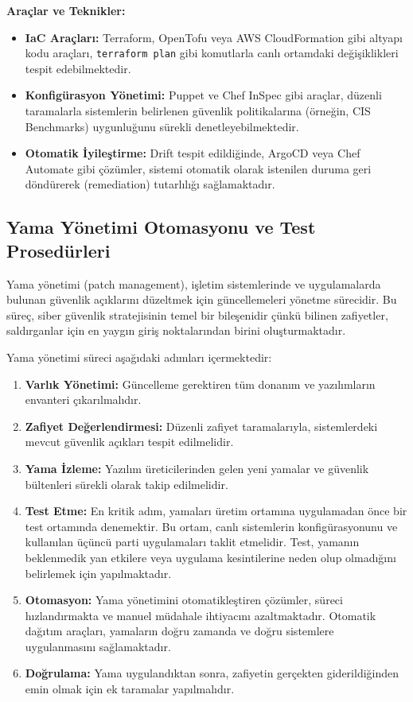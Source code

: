 \textbf{Araçlar ve Teknikler:}
\begin{itemize}
    \item \textbf{IaC Araçları:} Terraform, OpenTofu veya AWS CloudFormation gibi altyapı kodu araçları, \texttt{terraform plan} gibi komutlarla canlı ortamdaki değişiklikleri tespit edebilmektedir.
    \item \textbf{Konfigürasyon Yönetimi:} Puppet ve Chef InSpec gibi araçlar, düzenli taramalarla sistemlerin belirlenen güvenlik politikalarına (örneğin, CIS Benchmarks) uygunluğunu sürekli denetleyebilmektedir.
    \item \textbf{Otomatik İyileştirme:} Drift tespit edildiğinde, ArgoCD veya Chef Automate gibi çözümler, sistemi otomatik olarak istenilen duruma geri döndürerek (remediation) tutarlılığı sağlamaktadır.
\end{itemize}

\subsection{Yama Yönetimi Otomasyonu ve Test Prosedürleri}

Yama yönetimi (patch management), işletim sistemlerinde ve uygulamalarda bulunan güvenlik açıklarını düzeltmek için güncellemeleri yönetme sürecidir. Bu süreç, siber güvenlik stratejisinin temel bir bileşenidir çünkü bilinen zafiyetler, saldırganlar için en yaygın giriş noktalarından birini oluşturmaktadır.

Yama yönetimi süreci aşağıdaki adımları içermektedir:

\begin{enumerate}
    \item \textbf{Varlık Yönetimi:} Güncelleme gerektiren tüm donanım ve yazılımların envanteri çıkarılmalıdır.
    \item \textbf{Zafiyet Değerlendirmesi:} Düzenli zafiyet taramalarıyla, sistemlerdeki mevcut güvenlik açıkları tespit edilmelidir.
    \item \textbf{Yama İzleme:} Yazılım üreticilerinden gelen yeni yamalar ve güvenlik bültenleri sürekli olarak takip edilmelidir.
    \item \textbf{Test Etme:} En kritik adım, yamaları üretim ortamına uygulamadan önce bir test ortamında denemektir. Bu ortam, canlı sistemlerin konfigürasyonunu ve kullanılan üçüncü parti uygulamaları taklit etmelidir. Test, yamanın beklenmedik yan etkilere veya uygulama kesintilerine neden olup olmadığını belirlemek için yapılmaktadır.
    \item \textbf{Otomasyon:} Yama yönetimini otomatikleştiren çözümler, süreci hızlandırmakta ve manuel müdahale ihtiyacını azaltmaktadır. Otomatik dağıtım araçları, yamaların doğru zamanda ve doğru sistemlere uygulanmasını sağlamaktadır.
    \item \textbf{Doğrulama:} Yama uygulandıktan sonra, zafiyetin gerçekten giderildiğinden emin olmak için ek taramalar yapılmalıdır.
\end{enumerate}

